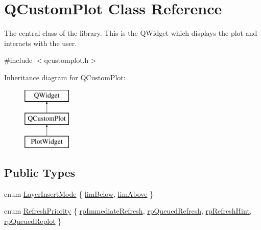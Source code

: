 \hypertarget{class_q_custom_plot}{}\section{Q\+Custom\+Plot Class Reference}
\label{class_q_custom_plot}


The central class of the library. This is the Q\+Widget which displays the plot and interacts with the user.  




{\ttfamily \#include $<$qcustomplot.\+h$>$}

Inheritance diagram for Q\+Custom\+Plot\+:\begin{figure}[H]
\begin{center}
\leavevmode
\includegraphics[height=3.000000cm]{dd/d9b/class_q_custom_plot}
\end{center}
\end{figure}
\subsection*{Public Types}
\begin{DoxyCompactItemize}
\item 
enum \mbox{\hyperlink{class_q_custom_plot_a75a8afbe6ef333b1f3d47abb25b9add7}{Layer\+Insert\+Mode}} \{ \mbox{\hyperlink{class_q_custom_plot_a75a8afbe6ef333b1f3d47abb25b9add7aee39cf650cd24e68552da0b697ce4a93}{lim\+Below}}, 
\mbox{\hyperlink{class_q_custom_plot_a75a8afbe6ef333b1f3d47abb25b9add7a062b0b7825650b432a713c0df6742d41}{lim\+Above}}
 \}
\item 
enum \mbox{\hyperlink{class_q_custom_plot_a45d61392d13042e712a956d27762aa39}{Refresh\+Priority}} \{ \mbox{\hyperlink{class_q_custom_plot_a45d61392d13042e712a956d27762aa39aa6eda645ccf1a60635df3e8b71ea6ae2}{rp\+Immediate\+Refresh}}, 
\mbox{\hyperlink{class_q_custom_plot_a45d61392d13042e712a956d27762aa39acd6f1e590ea775d1ddee666428077f3e}{rp\+Queued\+Refresh}}, 
\mbox{\hyperlink{class_q_custom_plot_a45d61392d13042e712a956d27762aa39a49666a5854a68dbcca8b277b03331260}{rp\+Refresh\+Hint}}, 
\mbox{\hyperlink{class_q_custom_plot_a45d61392d13042e712a956d27762aa39a019650c6ddf308f97e811fbfff207a8f}{rp\+Queued\+Replot}}
 \}
\end{DoxyCompactItemize}
